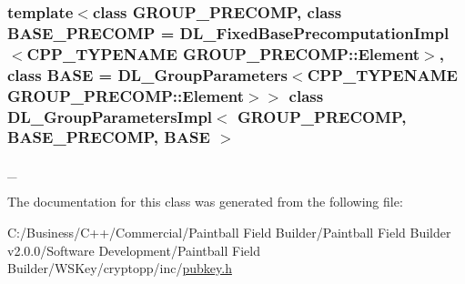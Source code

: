 \subsubsection*{template$<$class GROUP\_\-PRECOMP, class BASE\_\-PRECOMP = DL\_\-FixedBasePrecomputationImpl$<$CPP\_\-TYPENAME GROUP\_\-PRECOMP::Element$>$, class BASE = DL\_\-GroupParameters$<$CPP\_\-TYPENAME GROUP\_\-PRECOMP::Element$>$$>$ class DL\_\-GroupParametersImpl$<$ GROUP\_\-PRECOMP, BASE\_\-PRECOMP, BASE $>$}

\_\- 

The documentation for this class was generated from the following file:\begin{DoxyCompactItemize}
\item 
C:/Business/C++/Commercial/Paintball Field Builder/Paintball Field Builder v2.0.0/Software Development/Paintball Field Builder/WSKey/cryptopp/inc/\hyperlink{pubkey_8h}{pubkey.h}\end{DoxyCompactItemize}
